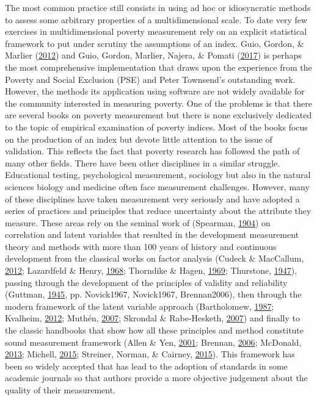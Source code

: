 \documentclass[]{book}
\begin{document}
The most common practice still consists in using ad hoc or idiosyncratic methods to assess some arbitrary properties of a multidimensional scale. To date very few exercises in multidimensional poverty measurement rely on an explicit statistical framework to put under scrutiny the assumptions of an index. Guio, Gordon, \& Marlier (\protect\hyperlink{ref-Guio2012}{2012}) and Guio, Gordon, Marlier, Najera, \& Pomati (\protect\hyperlink{ref-Guio2017}{2017}) is perhaps the most comprehensive implementation that draws upon the experience from the Poverty and Social Exclusion (PSE) and Peter Townsend's outstanding work. However, the methods its application using software are not widely available for the community interested in measuring poverty. One of the problems is that there are several books on poverty measurement but there is none exclusively dedicated to the topic of empirical examination of poverty indices. Most of the books focus on the production of an index but devote little attention to the issue of validation. This reflects the fact that poverty research has followed the path of many other fields. There have been other disciplines in a similar struggle. Educational testing, psychological measurement, sociology but also in the natural sciences biology and medicine often face measurement challenges. However, many of these disciplines have taken measurement very seriously and have adopted a series of practices and principles that reduce uncertainty about the attribute they measure. These areas rely on the seminal work of (Spearman, \protect\hyperlink{ref-Spearman1904}{1904}) on correlation and latent variables that resulted in the development measurement theory and methods with more than 100 years of history and continuous development from the classical works on factor analysis (Cudeck \& MacCallum, \protect\hyperlink{ref-Cudeck2012}{2012}; Lazardfeld \& Henry, \protect\hyperlink{ref-Lazardfeld1968}{1968}; Thorndike \& Hagen, \protect\hyperlink{ref-Thorndike1969}{1969}; Thurstone, \protect\hyperlink{ref-Thurstone1947}{1947}), passing through the development of the principles of validity and reliability (Guttman, \protect\hyperlink{ref-Guttman1945}{1945}, pp. Novick1967, Novick1967, Brennan2006), then through the modern framework of the latent variable approach (Bartholomew, \protect\hyperlink{ref-Bartholomew1987}{1987}; Kvalheim, \protect\hyperlink{ref-Kvalheim2012}{2012}; Muthén, \protect\hyperlink{ref-Muthen2007}{2007}; Skrondal \& Rabe-Hesketh, \protect\hyperlink{ref-Skrondal2007}{2007}) and finally to the classic handbooks that show how all these principles and method constitute sound measurement framework (Allen \& Yen, \protect\hyperlink{ref-Allen2001}{2001}; Brennan, \protect\hyperlink{ref-Brennan2006}{2006}; McDonald, \protect\hyperlink{ref-McDonald2013}{2013}; Michell, \protect\hyperlink{ref-Michell2015}{2015}; Streiner, Norman, \& Cairney, \protect\hyperlink{ref-Streiner2015}{2015}). This framework has been so widely accepted that has lead to the adoption of standards in some academic journals so that authors provide a more objective judgement about the quality of their measurement.
\end{document}
